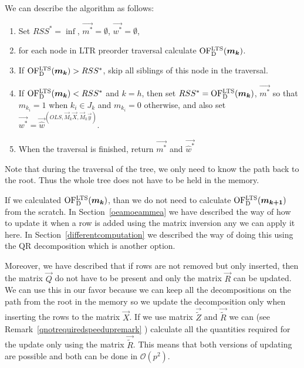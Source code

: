 We can describe the algorithm as follows:

\begin{enumerate}
    \item Set $RSS^* = \inf$, $\vec{m^*} = \emptyset$, $\vec{{w}^*} = \emptyset$,
    \item for each node in LTR preorder traversal calculate $\operatorname{OF^{LTS}_D}(\boldsymbol{m_k})$.
    \item If $\operatorname{OF^{LTS}_D}(\boldsymbol{m_k}) > RSS^*$, skip all siblings of this node in the traversal.
    \item If $\operatorname{OF^{LTS}_D}(\boldsymbol{m_k}) < RSS^* $ and $k = h$, then set $RSS^* = \operatorname{OF^{LTS}_D}(\boldsymbol{m_k})$, $\vec{m^*}$ so that $m_{k_i} = 1$ when $k_i \in J_k$ and $m_{k_i} = 0$ otherwise, and also set $\vec{{w}^*} = \vec{\hat{w}}^{(OLS,\vec{M}_{k}\vec{X}, \vec{M}_{k}\vec{y})}$.
 \item When the traversal is finished, return $\vec{m^*}$ and $\vec{\hat{w}^*}$
\end{enumerate}

Note that during the traversal of the tree, we only need to know the path back to the root. Thus the whole tree does not have to be held in the memory. 

\begin{remark}
If we calculated $\operatorname{OF^{LTS}_D}(\boldsymbol{m_{k}})$, than we do not need to calculate $\operatorname{OF^{LTS}_D}(\boldsymbol{m_{k+1}})$ from the scratch. In Section~\ref{oeamoeammea} we have described the way of how to update it when a row is added using the matrix inversion any we can apply it here. In Section~\ref{differentcomputation} we described the way of doing this using the QR decomposition which is another option. 

Moreover, we have described that if rows are not removed but only inserted, then the matrix $\vec{Q}$ do not have to be present and only the matrix $\vec{R}$ can be updated. We can use this in our favor because we can keep all the decompositions on the path from the root in the memory so we update the decomposition only when inserting the rows to the matrix $\vec{X}$.  If we use matrix $\vec{\tilde{Z}}$ and $\vec{\tilde{R}}$ we can  (see Remark~\ref{qnotrequiredspeedupremark} ) calculate all the quantities required for the update only using the matrix $\vec{\tilde{R}}$. This means that both versions of updating are possible and both can be done in $\mathcal{O}(p^2)$.
\end{remark}

